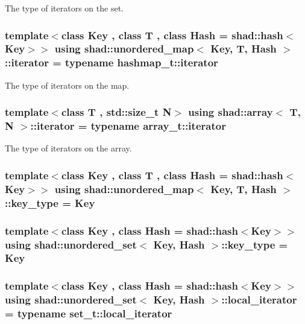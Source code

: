 The type of iterators on the set. 

\hypertarget{group__Types_gab52d604c26835c20a0363f9affa7ff57}{
\subsubsection[{iterator}]{\setlength{\rightskip}{0pt plus 5cm}template$<$class Key , class T , class Hash  = shad\-::hash$<$\-Key$>$$>$ using {\bf shad\-::unordered\-\_\-map}$<$ Key, T, Hash $>$\-::iterator =  typename hashmap\-\_\-t\-::iterator}}\label{group__Types_gab52d604c26835c20a0363f9affa7ff57}


The type of iterators on the map. 

\hypertarget{group__Types_ga7b1db0deafc45673f50da5aacb8c372c}{
\subsubsection[{iterator}]{\setlength{\rightskip}{0pt plus 5cm}template$<$class T , std\-::size\-\_\-t N$>$ using {\bf shad\-::array}$<$ T, N $>$\-::iterator =  typename array\-\_\-t\-::iterator}}\label{group__Types_ga7b1db0deafc45673f50da5aacb8c372c}


The type of iterators on the array. 

\hypertarget{group__Types_gac2a5bb16d47a5da2d493616e6fa5a73c}{
\subsubsection[{key\-\_\-type}]{\setlength{\rightskip}{0pt plus 5cm}template$<$class Key , class T , class Hash  = shad\-::hash$<$\-Key$>$$>$ using {\bf shad\-::unordered\-\_\-map}$<$ Key, T, Hash $>$\-::key\-\_\-type =  Key}}\label{group__Types_gac2a5bb16d47a5da2d493616e6fa5a73c}
\hypertarget{group__Types_gae860c65ed861f8aa69b0360638f4ad5d}{
\subsubsection[{key\-\_\-type}]{\setlength{\rightskip}{0pt plus 5cm}template$<$class Key , class Hash  = shad\-::hash$<$\-Key$>$$>$ using {\bf shad\-::unordered\-\_\-set}$<$ Key, Hash $>$\-::key\-\_\-type =  Key}}\label{group__Types_gae860c65ed861f8aa69b0360638f4ad5d}
\hypertarget{group__Types_gae1ee2e5ce1b39afa3cb1ce248747324d}{
\subsubsection[{local\-\_\-iterator}]{\setlength{\rightskip}{0pt plus 5cm}template$<$class Key , class Hash  = shad\-::hash$<$\-Key$>$$>$ using {\bf shad\-::unordered\-\_\-set}$<$ Key, Hash $>$\-::local\-\_\-iterator =  typename set\-\_\-t\-::local\-\_\-iterator}}\label{group__Types_gae1ee2e5ce1b39afa3cb1ce248747324d}


